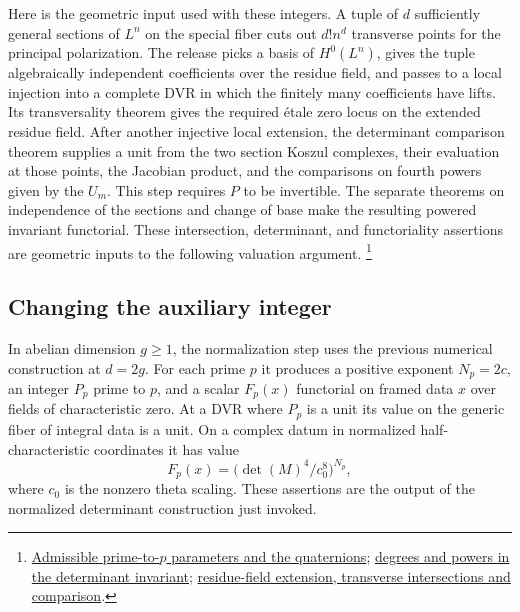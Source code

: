 Here is the geometric input used with these integers. A tuple of
\(d\) sufficiently general sections of \(L^n\) on the special
fiber cuts out \(d!n^d\) transverse points for the principal
polarization. The release picks a basis of \(H^0(L^n)\), gives
the tuple algebraically independent coefficients over the residue
field, and passes to a local injection into a complete DVR in
which the finitely many coefficients have lifts. Its transversality
theorem gives the required étale zero locus on the extended residue
field. After another injective local extension, the determinant
comparison theorem supplies a unit from the two section Koszul
complexes, their evaluation at those points, the Jacobian product,
and the comparisons on fourth powers given by the \(U_m\). This
step requires \(P\) to be invertible. The separate theorems on
independence of the sections and change of base make the resulting
powered invariant functorial. These intersection, determinant,
and functoriality assertions are geometric inputs to the following
valuation argument.
\footnote{\href{https://github.com/ChristianKudeba/alpoge-rh-verification/blob/alpoge-source-7cbf7a0c/src/Development/AbelianVarietyTheory/Proofs/ThetaLawProofs/ExistsAdmissibleKeyNumericalDataPrimeTo.lean}{Admissible prime-to-\(p\) parameters and the quaternions};
\href{https://github.com/ChristianKudeba/alpoge-rh-verification/blob/alpoge-source-7cbf7a0c/src/Development/AbelianVarietyTheory/Definitions/KeyFormula/DegProd.lean}{degrees and powers in the determinant invariant};
\href{https://github.com/ChristianKudeba/alpoge-rh-verification/blob/alpoge-source-7cbf7a0c/src/Development/AbelianVarietyTheory/Proofs/ThetaLawProofs/ExistsIntegralKeyInvariantRuleCharZero.lean}{residue-field extension, transverse intersections and comparison}.}

\subsection{Changing the auxiliary integer}

In abelian dimension \(g\ge1\), the normalization step uses the
previous numerical construction at \(d=2g\). For each prime \(p\)
it produces a positive exponent \(N_p=2c\), an integer \(P_p\)
prime to \(p\), and a scalar \(F_p(x)\) functorial on framed
data \(x\) over fields of characteristic zero. At a DVR where
\(P_p\) is a unit its value on the generic fiber of integral
data is a unit. On a complex datum in normalized half-characteristic
coordinates it has value
\[
          F_p(x)=\bigl(\det(M)^4/c_0^8\bigr)^{N_p},
\]
where \(c_0\) is the nonzero theta scaling. These assertions are
the output of the normalized determinant construction just invoked.

